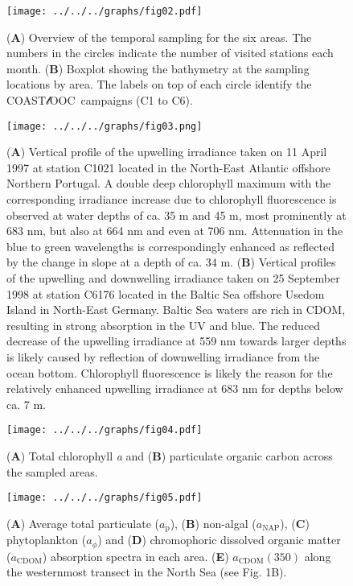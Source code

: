 \documentclass[essd, manuscript]{copernicus}
\newcommand{\coastlooc}{COAST$\mathscr{l}$OOC~\allowbreak}
\begin{document}
\clearpage

\begin{figure}[t]
    \texttt{[image: ../../../graphs/fig02.pdf]}
    \caption{(\textbf{A}) Overview of the temporal sampling for the six areas. The numbers in the circles indicate the number of visited stations each month. (\textbf{B}) Boxplot showing the bathymetry at the sampling locations by area. The labels on top of each circle identify the \coastlooc campaigns (C1 to C6).}
\end{figure}

\clearpage

\begin{figure}[t]
    \texttt{[image: ../../../graphs/fig03.png]}
    \caption{(\textbf{A}) Vertical profile of the upwelling irradiance taken on 11 April 1997 at station C1021 located in the North-East Atlantic offshore Northern Portugal. A double deep chlorophyll maximum with the corresponding irradiance increase due to chlorophyll fluorescence is observed at water depths of ca. 35 m and 45 m, most prominently at 683 nm, but also at 664 nm and even at 706 nm. Attenuation in the blue to green wavelengths is correspondingly enhanced as reflected by the change in slope at a depth of ca. 34 m. (\textbf{B}) Vertical profiles of the upwelling and downwelling irradiance taken on 25 September 1998 at station C6176 located in the Baltic Sea offshore Usedom Island in North-East Germany. Baltic Sea waters are rich in CDOM, resulting in strong absorption in the UV and blue. The reduced decrease of the upwelling irradiance at 559 nm towards larger depths is likely caused by reflection of downwelling irradiance from the ocean bottom. Chlorophyll fluorescence is likely the reason for the relatively enhanced upwelling irradiance at 683 nm for depths below ca. 7 m.}
\end{figure}

\clearpage

\begin{figure}[t]
    \texttt{[image: ../../../graphs/fig04.pdf]}
    \caption{(\textbf{A}) Total chlorophyll \textit{a} and (\textbf{B}) particulate organic carbon across the sampled areas.}
\end{figure}

\clearpage

\begin{figure}[t]
    \texttt{[image: ../../../graphs/fig05.pdf]}
    \caption{(\textbf{A}) Average total particulate ($a_\text{p}$), (\textbf{B}) non-algal ($a_\text{NAP}$), (\textbf{C}) phytoplankton ($a_{\phi}$) and (\textbf{D}) chromophoric dissolved organic matter ($a_\text{CDOM}$) absorption spectra in each area. (\textbf{E}) $a_\text{CDOM}(350)$ along the westernmost transect in the North Sea (see Fig. 1B).}
\end{figure}
\end{document}
